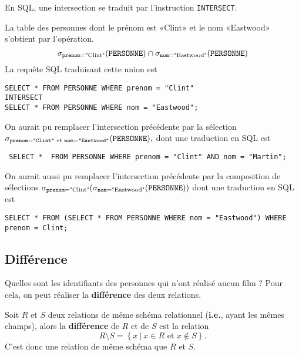 En SQL, une intersection se traduit par l'instruction \texttt{INTERSECT}.
\begin{exemple}
La table des personnes dont le prénom est «Clint» et le nom «Eastwood» s'obtient par l'opération.
\begin{equation*}
  \sigma_{\mathtt{prenom}=\text{"Clint"}}(\mathtt{PERSONNE})\cap \sigma_{\mathtt{nom}=\text{"Eastwood"}}(\mathtt{PERSONNE})
\end{equation*}
La requête SQL traduisant cette union est 
\begin{verbatim}
SELECT * FROM PERSONNE WHERE prenom = "Clint"
INTERSECT
SELECT * FROM PERSONNE WHERE nom = "Eastwood";
\end{verbatim}
\end{exemple}

\begin{rem}
  On aurait pu remplacer l'intersection précédente par la sélection 
  $    \sigma_{\mathtt{prenom}=\texttt{"Clint"}\textrm{ et }\mathtt{nom}=\texttt{"Eastwood"}}(\mathtt{PERSONNE}),$
  dont une traduction en SQL est 
\begin{verbatim} SELECT *  FROM PERSONNE WHERE prenom = "Clint" AND nom = "Martin";\end{verbatim}


  On aurait aussi pu remplacer l'intersection précédente par la composition de sélections
  $    \sigma_{\mathtt{prenom}=\text{"Clint"}}(\sigma_{\mathtt{nom}=\text{"Eastwood"}}(\mathtt{PERSONNE})) $
  dont une traduction en SQL est 
\begin{verbatim}
SELECT * FROM (SELECT * FROM PERSONNE WHERE nom = "Eastwood") WHERE prenom = Clint; \end{verbatim}
\end{rem}

\subsection{Différence}
Quelles sont les identifiants des personnes qui n'ont réalisé aucun film ? Pour cela, on peut réaliser  la \textbf{différence} des deux relations.

\begin{defi}[Différence]
  Soit $R$ et $S$ deux relations de même schéma relationnel (\textbf{i.e.}, ayant les mêmes champs), alors la \textbf{différence} de $R$ et de $S$ est la relation 
  \begin{equation*}
    R\setminus S = \left\{x ~|~ x\in R\textrm{ et }x\notin S\right\}.
  \end{equation*}
  C'est donc une relation de même schéma que $R$ et $S$.
\end{defi}

